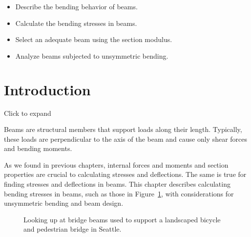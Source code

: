 \documentclass[
  letterpaper,
  DIV=11,
  numbers=noendperiod]{scrreprt}
\providecommand{\tightlist}{%
  \setlength{\itemsep}{0pt}\setlength{\parskip}{0pt}}\usepackage{longtable,booktabs,array}
\theoremstyle{definition}
\theoremstyle{remark}
\begin{document}
\begin{tcolorbox}[enhanced jigsaw, leftrule=.75mm, bottomrule=.15mm, opacityback=0, opacitybacktitle=0.6, colframe=quarto-callout-note-color-frame, toprule=.15mm, colbacktitle=quarto-callout-note-color!10!white, coltitle=black, bottomtitle=1mm, title={Learning Objectives}, titlerule=0mm, toptitle=1mm, colback=white, rightrule=.15mm, left=2mm, arc=.35mm, breakable]

\begin{itemize}
\tightlist
\item
  Describe the bending behavior of beams.
\item
  Calculate the bending stresses in beams.
\item
  Select an adequate beam using the section modulus.
\item
  Analyze beams subjected to unsymmetric bending.
\end{itemize}

\end{tcolorbox}

\section*{Introduction}\label{introduction-8}


Click to expand

Beams are structural members that support loads along their length.
Typically, these loads are perpendicular to the axis of the beam and
cause only shear forces and bending moments.\,

As we found in previous chapters, internal forces and moments and
section properties are crucial to calculating stresses and deflections.
The same is true for finding stresses and deflections in beams. This
chapter describes calculating bending stresses in beams, such as those
in Figure~\ref{fig-9.1}, with considerations for unsymmetric bending and
beam design.

\begin{figure}


\caption{\label{fig-9.1}Looking up at bridge beams used to support a
landscaped bicycle and pedestrian bridge in Seattle.}

\end{figure}%
\end{document}
